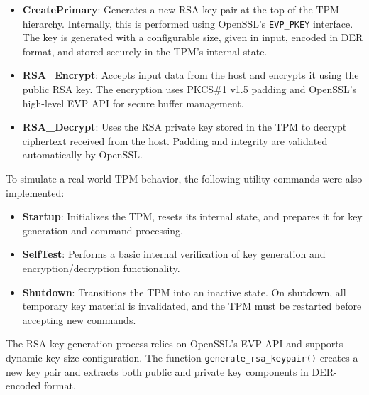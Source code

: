         \begin{itemize}
            \item \textbf{CreatePrimary}:   Generates a new RSA key pair at the top of the TPM hierarchy. 
                                            Internally, this is performed using OpenSSL’s \texttt{EVP\_PKEY} interface. 
                                            The key is generated with a configurable size, given in input, encoded in DER format, 
                                            and stored securely in the TPM's internal state.
            
            \item \textbf{RSA\_Encrypt}:    Accepts input data from the host and encrypts it using the public RSA key. 
                                            The encryption uses PKCS\#1 v1.5 padding and OpenSSL's high-level EVP API for secure buffer management.
            
            \item \textbf{RSA\_Decrypt}:    Uses the RSA private key stored in the TPM to decrypt ciphertext received from the host. 
                                            Padding and integrity are validated automatically by OpenSSL.
        \end{itemize}

        To simulate a real-world TPM behavior, the following utility commands were also implemented:

        \begin{itemize}
            \item \textbf{Startup}:     Initializes the TPM, resets its internal state, and prepares it for key generation and command processing.
            
            \item \textbf{SelfTest}:    Performs a basic internal verification of key generation and encryption/decryption functionality. 
            
            \item \textbf{Shutdown}:    Transitions the TPM into an inactive state. On shutdown, all temporary key material is invalidated, 
                                        and the TPM must be restarted before accepting new commands.
        \end{itemize}

        The RSA key generation process relies on OpenSSL’s EVP API and supports dynamic key size configuration. 
        The function \texttt{generate\_rsa\_keypair()} creates a new key pair and extracts both public and private key components in DER-encoded format.

